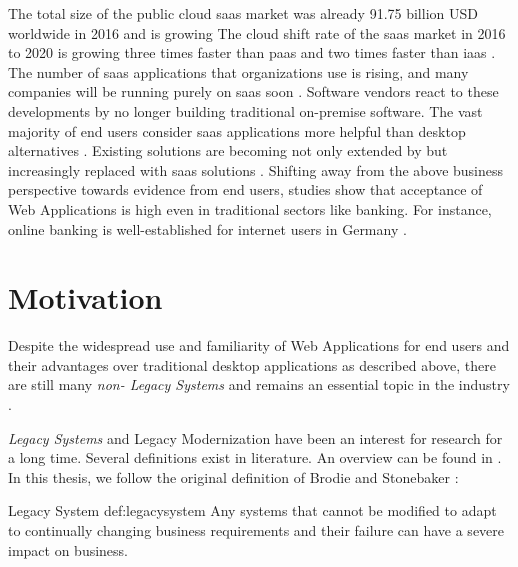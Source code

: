 The total size of the public cloud \gls{saas} market was already 91.75 billion USD worldwide in 2016 \autocite{Statista2018SaaSMarketSize} and is growing \autocite{Statista2018SaaSMarketSize,BetterCloud2017SaaSWorkplace,Chan2018SaaSStatistics}
The cloud shift rate of the \gls{saas} market in 2016 to 2020 is growing three times faster than \gls{paas} and two times faster than \gls{iaas} \autocite{BetterCloud2017SaaSWorkplace}.
The number of \gls{saas} applications that organizations use is rising, and many companies will be running purely on \gls{saas} soon \autocite{BetterCloud2017SaaSWorkplace}.
Software vendors react to these developments by no longer building traditional on-premise software.
The vast majority of end users consider \gls{saas} applications more helpful than desktop alternatives \autocite{BetterCloud2017SaaSWorkplace}.
Existing solutions are becoming not only extended by but increasingly replaced with \gls{saas} solutions \autocite{Gartner2012SaaSSurvey}.
Shifting away from the above business perspective towards evidence from end users, studies show that acceptance of \glspl{Web Application} is high even in traditional sectors like banking.
For instance, online banking is well-established for internet users in Germany \autocite{BitkomResearch2016DigitalBanking}.

\hypertarget{motivation}{%
\section{Motivation}\label{motivation}}

Despite the widespread use and familiarity of \glspl{Web Application} for end users and their advantages over traditional desktop applications as described above, there are still many \emph{non- \glspl{Legacy System}} and  remains an essential topic in the industry \autocite{Batlajery2014IndustrialSurveyModernization,Khadka2014ProfessionalsModernization,Gartner2013CIOAgenda,Gartner2013Priorities,NASCIO2016,ForresterResearch2011Modernization}.

\emph{\glspl{Legacy System}} and \gls{Legacy Modernization} have been an interest for research for a long time.
Several definitions exist in literature.
An overview can be found in \autocite{Wagner2014}.
In this thesis, we follow the original definition of Brodie and Stonebaker \autocite{Brodie1995Migrating}:

\begin{thesisdefinition}{Legacy System \autocite{Brodie1995Migrating}}{def:legacysystem}
Any systems that cannot be modified to adapt to continually changing business requirements and their failure can have a severe impact on business.
\end{thesisdefinition}

